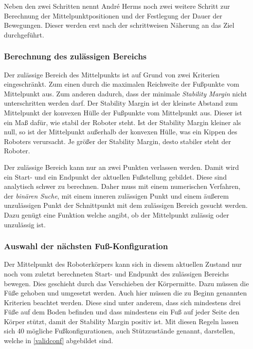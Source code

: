 Neben den zwei Schritten nennt André Herms \autocite{herms2004} noch zwei weitere Schritt zur Berechnung der Mittelpunktpositionen und der Festlegung der Dauer der Bewegungen. Dieser werden erst nach der schrittweisen Näherung an das Ziel durchgeführt.

\subsubsection{Berechnung des zulässigen Bereichs}

Der zulässige Bereich des Mittelpunkts ist auf Grund von zwei Kriterien eingeschränkt. Zum einen durch die maximalen Reichweite der Fußpunkte vom Mittelpunkt aus. Zum anderen dadurch, dass der minimale \emph{Stability Margin} nicht unterschritten werden darf. Der Stability Margin ist der kleinste Abstand zum Mittelpunkt der konvexen Hülle der Fußpunkte vom Mittelpunkt aus. Dieser ist ein Maß dafür, wie stabil der Roboter steht. Ist der Stability Margin kleiner als null, so ist der Mittelpunkt außerhalb der konvexen Hülle, was ein Kippen des Roboters verursacht. Je größer der Stability Margin, desto stabiler steht der Roboter.

Der zulässige Bereich kann nur an zwei Punkten verlassen werden. Damit wird ein Start- und ein Endpunkt der aktuellen Fußstellung gebildet. Diese sind analytisch schwer zu berechnen. Daher muss mit einem numerischen Verfahren, der \emph{binären Suche}, mit einem inneren zulässigen Punkt und einem äußerem unzulässigen Punkt der Schnittpunkt mit dem zulässigen Bereich gesucht werden. Dazu genügt eine Funktion welche angibt, ob der Mittelpunkt zulässig oder unzulässig ist.

\subsubsection{Auswahl der nächsten Fuß-Konfiguration}

Der Mittelpunkt des Roboterkörpers kann sich in diesem aktuellen Zustand nur noch vom zuletzt berechneten Start- und Endpunkt des zulässigen Bereichs bewegen. Dies geschieht durch das Verschieben der Körpermitte. Dazu müssen die Füße gehoben und umgesetzt werden. Auch hier müssen die zu Beginn genannten Kriterien beachtet werden. Diese sind unter anderem, dass sich mindestens drei Füße auf dem Boden befinden und dass mindestens ein Fuß auf jeder Seite den Körper stützt, damit der Stability Margin positiv ist. Mit diesen Regeln lassen sich 40 mögliche Fußkonfigurationen, auch Stützzustände genannt, darstellen, welche in \autoref{validconf} abgebildet sind.

